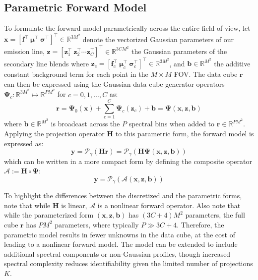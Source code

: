 \documentclass[linenumbers,twocolumn]{aastex7}
\begin{document}
\subsection{Parametric Forward Model}
To formulate the forward model parametrically across the entire field of view,
let $\bm x = [\bm f^\top \ \bm \mu ^\top \ \bm \sigma^\top ]^\top \in \mathbb
R^{3M^2}$ denote the vectorized Gaussian parameters of our emission line, $\bm z
= [\bm z_1^\top \ \bm z_2 ^\top \cdots \bm z_C^\top ]^\top \in \mathbb
R^{3CM^2}$ the Gaussian parameters of the secondary line blends where $\bm z_c =
[\bm f_c^\top \ \bm \mu_c ^\top \ \bm \sigma_c^\top ]^\top \in \mathbb
R^{3M^2}$, and $\bm b \in \mathbb R^{M^2}$ the additive constant background term
for each point in the $M \times M$ FOV. The data cube $\bm r$ can then be
expressed using the Gaussian data cube generator operators $\bm \Psi_c: \mathbb
R^{3M^2} \mapsto \mathbb R^{PM^2}$ for $c = 0, 1, \ldots, C$ as:
\begin{equation}
\bm r = \bm \Psi_0 (\bm x) + \sum_{c=1}^{C} \bm \Psi_c (\bm z_c) + \bm b
= \bm \Psi(\bm x, \bm z, \bm b)
\end{equation}
where $\bm b \in \mathbb R^{M^2}$ is broadcast across the $P$ spectral bins when
added to $\bm r \in \mathbb R^{PM^2}$.
Applying the projection operator $\bm H$ to this parametric form, the forward
model is expressed as:
\begin{equation}
\bm y = \mathcal{P}_\gamma(\bm H \bm r) = \mathcal{P}_\gamma(\bm H \bm \Psi (\bm
x, \bm z, \bm b))
\end{equation}
which can be written in a more compact form by defining the composite operator
$\bm{\mathcal A} := \bm H \circ \bm \Psi$:
\begin{equation}
\bm y = \mathcal{P}_\gamma(\bm {\mathcal A}(\bm x, \bm z, \bm b))
\label{eq:fwd_nl}
\end{equation}

To highlight the differences between the discretized and the parametric forms,
note that while $\bm H$ is linear, $\bm {\mathcal A}$ is a nonlinear forward
operator. Also note that while the parameterized form $(\bm x, \bm z, \bm b)$
has $(3C+4)M^2$ parameters, the full cube $\bm r$ has $PM^2$ parameters, where
typically $P \gg 3C+4$. Therefore, the parametric model results in fewer unknowns
in the data cube, at the cost of leading to a nonlinear forward model. The
model can be extended to include additional spectral components or non-Gaussian
profiles, though increased spectral complexity reduces identifiability given the
limited number of projections $K$.
\end{document}
